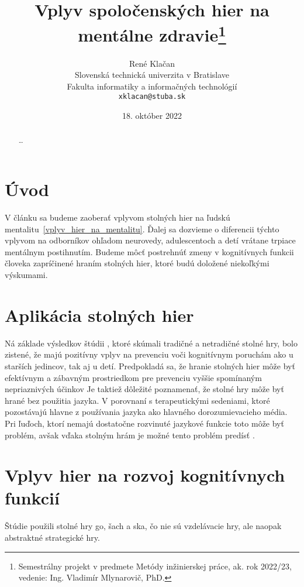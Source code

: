 \documentclass[10pt,oneside,slovak,a4paper]{article}
\title{Vplyv spoločenských hier na mentálne zdravie\thanks{Semestrálny projekt v predmete Metódy inžinierskej práce, ak. rok 2022/23, vedenie: Ing. Vladimír Mlynarovič, PhD.}} %
\author{René Klačan\\[2pt]
	{\small Slovenská technická univerzita v Bratislave}\\
	{\small Fakulta informatiky a informačných technológií}\\
	{\small \texttt{xklacan@stuba.sk}}
	}
\date{\small 18. október 2022}
\begin{document}
\maketitle
\begin{abstract}
\ldots
\end{abstract}



\section{Úvod}

V článku sa budeme zaoberať vplyvom stolných hier na ľudskú mentalitu~\ref{vplyv_hier_na_mentalitu}. Ďalej sa dozvieme o diferencii týchto vplyvom na odborníkov ohľadom neurovedy, adulescentoch a detí vrátane trpiace mentálnym postihnutím. Budeme môcť postrehnúť zmeny v kognitívnych funkcii človeka zapríčinené hraním stolných hier, ktoré budú doložené niekoľkými výskumami.


\section{Aplikácia stolných hier} \label{aplikacie_hier}
Ná základe výsledkov štúdii \cite{Nakao:BG}, ktoré skúmali tradičné a netradičné stolné hry, bolo zistené, že majú pozitívny vplyv na prevenciu voči kognitívnym poruchám ako u starších jedincov, tak aj u detí.
Predpokladá sa, že hranie stolných hier môže byť efektívnym a zábavným prostriedkom pre prevenciu vyššie spomínaným nepriaznivých účinkov \cite{Edu:GFH}
Je taktiež dôležité poznamenať, že stolné hry môže byť hrané bez použitia jazyka. V porovnaní s terapeutickými sedeniami, ktoré pozostávajú hlavne z používania jazyka ako hlavného dorozumievacieho média. Pri ľuďoch, ktorí nemajú dostatočne rozvinuté jazykové funkcie toto môže byť problém, avšak vďaka stolným hrám je možné tento problém predísť \cite{Charlier:2013}.

\section{Vplyv hier na rozvoj kognitívnych funkcií} \label{hry_kognitivne_funkcie}
Štúdie \cite{} použili stolné hry go, šach a ska, čo nie sú vzdelávacie hry, ale naopak abstraktné strategické hry.
\end{document}
